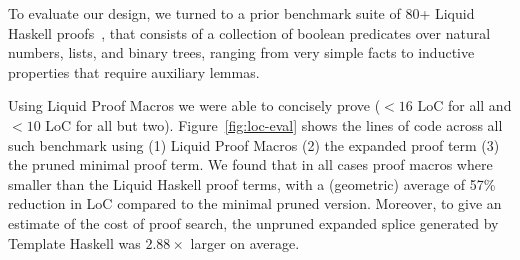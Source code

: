 \smallskip

To evaluate our design, we turned to a prior benchmark suite of 80+
Liquid Haskell proofs~\cite{TacticThesis}, that consists of a
collection of boolean predicates over natural numbers, lists, and
binary trees, ranging from very simple facts to inductive properties
that require auxiliary lemmas.

Using Liquid Proof Macros we were able to concisely prove ($<16$ LoC
for all and $<10$ LoC for all but two). Figure~\ref{fig:loc-eval}
shows the lines of code across all such benchmark using (1) Liquid
Proof Macros (2) the expanded proof term (3) the pruned minimal proof
term. We found that in all cases proof macros where smaller than the
Liquid Haskell proof terms, with a (geometric) average of 57\%
reduction in LoC compared to the minimal pruned version. Moreover, to
give an estimate of the cost of proof search, the unpruned expanded
splice generated by Template Haskell was $2.88\times$ larger on
average.

%  


%  
%  

